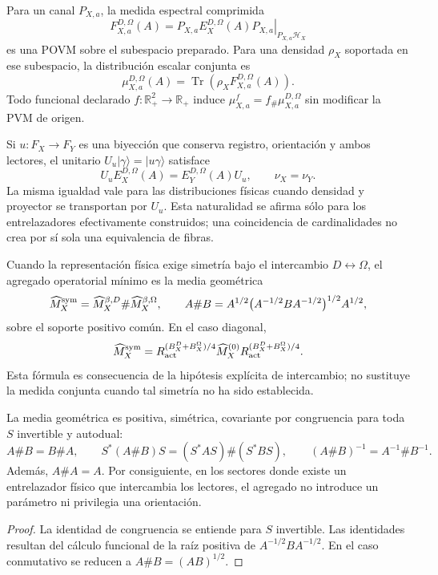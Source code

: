 Para un canal \(P_{X,a}\), la medida espectral comprimida
\[
 F_{X,a}^{D,\Omega}(A)
 =\left.P_{X,a}E_X^{D,\Omega}(A)P_{X,a}\right|_{P_{X,a}\mathcal H_X}
\]
es una POVM sobre el subespacio preparado. Para una densidad \(\rho_X\)
soportada en ese subespacio, la distribución escalar conjunta es
\[
 \mu_{X,a}^{D,\Omega}(A)
 =\operatorname{Tr}\!\left(
 \rho_X F_{X,a}^{D,\Omega}(A)
 \right).
\]
Todo funcional declarado \(f:\mathbb R_+^2\to\mathbb R_+\) induce
\(\mu_{X,a}^f=f_\#\mu_{X,a}^{D,\Omega}\) sin modificar la PVM de origen.

Si \(u:F_X\to F_Y\) es una biyección que conserva registro, orientación y
ambos lectores, el unitario \(U_u|\gamma\rangle=|u\gamma\rangle\) satisface
\[
 U_uE_X^{D,\Omega}(A)=E_Y^{D,\Omega}(A)U_u,
 \qquad
 \nu_X=\nu_Y.
\]
La misma igualdad vale para las distribuciones físicas cuando densidad y
proyector se transportan por \(U_u\). Esta naturalidad se afirma sólo para
los entrelazadores efectivamente construidos; una coincidencia de
cardinalidades no crea por sí sola una equivalencia de fibras.

Cuando la representación física exige simetría bajo el intercambio
\(D\leftrightarrow\Omega\), el agregado operatorial mínimo es la media
geométrica
\[
 \widehat M_X^{\rm sym}
 =\widehat M_X^{\beta,D}\#\widehat M_X^{\beta,\Omega},
 \qquad
 A\#B
 =A^{1/2}\bigl(A^{-1/2}BA^{-1/2}\bigr)^{1/2}A^{1/2},
\]
sobre el soporte positivo común. En el caso diagonal,
\[
 \widehat M_X^{\rm sym}
 =R_{\rm act}^{(B_X^D+B_X^\Omega)/4}
  \widehat M_X^{(0)}
  R_{\rm act}^{(B_X^D+B_X^\Omega)/4}.
\]
Esta fórmula es consecuencia de la hipótesis explícita de intercambio; no
sustituye la medida conjunta cuando tal simetría no ha sido establecida.

\begin{theorem}
La media geométrica es positiva, simétrica, covariante por congruencia para
toda \(S\) invertible y autodual:
\[
 A\#B=B\#A,
 \qquad
 S^*(A\#B)S=(S^*AS)\#(S^*BS),
 \qquad
 (A\#B)^{-1}=A^{-1}\#B^{-1}.
\]
Además, \(A\#A=A\). Por consiguiente, en los sectores donde existe un
entrelazador físico que intercambia los lectores, el agregado no introduce un
parámetro ni privilegia una orientación.
\end{theorem}

\begin{proof}
La identidad de congruencia se entiende para \(S\) invertible. Las identidades
resultan del cálculo funcional de la raíz positiva de
\(A^{-1/2}BA^{-1/2}\). En el caso conmutativo se reducen a
\(A\#B=(AB)^{1/2}\).
\end{proof}

